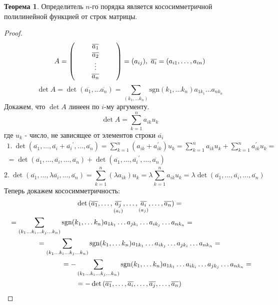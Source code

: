 \documentclass[a4paper, 12pt]{article}
\newcommand\tab[1][.5cm]{\hspace*{#1}}
\newcounter{thcount}
\theoremstyle{definition}
\newtheorem{theoremnum}[thcount]{Теорема}
\begin{document}
  \begin{theoremnum}
    Определитель $n$-го порядка является кососимметричной полилинейной функцией от строк матрицы.    
  \end{theoremnum} 
  \begin{proof}
    $$A=\begin{pmatrix}
      \tab & \overline{a_1} & \tab\\
      \null & \overline{a_2} & \null\\
      \null & \vdots & \null\\
      \null & \overline{a_n} & \null
    \end{pmatrix}=(a_{ij}),\ \overline{a_i}=(a_{i1},\dots, a_{in})$$
    $$\det{A}=\det{(\overline{a_1},\dots \overline{a_n})}=\sum\limits_{(k_1,\dots k_n)}\textrm{sgn}(k_1,\dots k_n)a_{1k_1}\dots a_{nk_n}$$
    Докажем, что $\det{A}$ линеен по $i$-му аргументу.
    $$\det{A}=\sum\limits_{k=1}^na_{ik}u_k$$
    где $u_k$ - число, не зависящее от элементов строки $\overline{a_i}$
    \begin{multline*}
      1.\ \det(\overline{a_1},\dots,\overline{a_i}+{\overline{a_i}}^{\prime},\dots, \overline{a_n})=\sum\limits_{k=1}^n(a_{ik}+a_{ik}^{\prime})u_k=\sum\limits_{k=1}^na_{ik}u_k+\sum\limits_{k=1}^na_{ik}^{\prime}u_k=\\=\det{(\overline{a_1},\dots,\overline{a_i},\dots, \overline{a_n})}+\det{(\overline{a_1},\dots,\overline{a_i}^{\prime},\dots, \overline{a_n})}
    \end{multline*}
    $$2.\ \det{(\overline{a_1},\dots,\lambda\overline{a_i},\dots, \overline{a_n})}=\sum\limits_{k=1}^n(\lambda a_{ik})u_k=\lambda\sum\limits_{k=1}^na_{ik}u_k=\lambda\det{(\overline{a_1},\dots,\overline{a_i},\dots, \overline{a_n})}$$
    Теперь докажем кососимметричность:
    \begin{multline*}
    \det{(\overline{a_1},\dots,\underset{(a_i)}{\overline{a_j}},\dots,\underset{(a_j)}{\overline{a_i}},\dots,\overline{a_n})}=\\ \tab[-2.8cm]=\sum\limits_{(k_1\dots k_i\dots k_j\dots k_n)}\textrm{sgn}(k_1,\dots k_n)a_{1k_1}\dots a_{jk_i}\dots a_{ik_j}\dots a_{nk_n}=\\=\sum\limits_{(k_1\dots k_i\dots k_j\dots k_n)}\textrm{sgn}(k_1,\dots k_n)a_{1k_1}\dots a_{ik_j}\dots a_{jk_i}\dots a_{nk_n}=\\=-\sum\limits_{(k_1\dots k_i\dots k_j\dots k_n)}\textrm{sgn}(k_1,\dots k_n)a_{1k_1}\dots a_{ik_i}\dots a_{jk_j}\dots a_{nk_n}=\tab[-2.8cm]\\=-\det{(\overline{a_1},\dots,\overline{a_i},\dots,\overline{a_j},\dots,\overline{a_n})}
    \end{multline*}
  \end{proof} 
\end{document}
